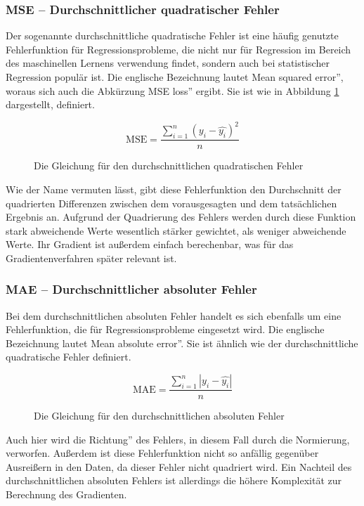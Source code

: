 \documentclass[11pt]{article}
\begin{document}
\subsubsection{MSE -- Durchschnittlicher quadratischer Fehler}
Der sogenannte durchschnittliche quadratische Fehler ist eine häufig genutzte Fehlerfunktion für Regressionsprobleme, die nicht nur für Regression im Bereich des maschinellen Lernens verwendung findet, sondern auch bei statistischer Regression populär ist. Die englische Bezeichnung lautet \glqq Mean squared error'', woraus sich auch die Abkürzung \glqq MSE loss'' ergibt. Sie ist wie in Abbildung \ref{MSE_equation} dargestellt, definiert.
\begin{figure}[h]
	\begin{equation*}
		\textrm{MSE}=\dfrac{\sum\limits_{i=1}^n(y_i-\hat{y_i})^2}{n}
	\end{equation*}
	\caption{Die Gleichung für den durchschnittlichen quadratischen Fehler}
	\label{MSE_equation}
\end{figure}
\newline
Wie der Name vermuten lässt, gibt diese Fehlerfunktion den Durchschnitt der quadrierten Differenzen zwischen dem vorausgesagten und dem tatsächlichen Ergebnis an. Aufgrund der Quadrierung des Fehlers werden durch diese Funktion stark abweichende Werte wesentlich stärker gewichtet, als weniger abweichende Werte. Ihr Gradient ist außerdem einfach berechenbar, was für das Gradientenverfahren später relevant ist.\cite{3}
\subsubsection{MAE -- Durchschnittlicher absoluter Fehler}
Bei dem durchschnittlichen absoluten Fehler handelt es sich ebenfalls um eine Fehlerfunktion, die für Regressionsprobleme eingesetzt wird. Die englische Bezeichnung lautet \glqq Mean absolute error''. Sie ist ähnlich wie der durchschnittliche quadratische Fehler definiert.
\begin{figure}[h]
	\begin{equation*}
	\textrm{MAE}=\dfrac{\sum\limits_{i=1}^n|y_i-\hat{y_i}|}{n}
	\end{equation*}
	\caption{Die Gleichung für den durchschnittlichen absoluten Fehler}
	\label{MAE_equation}
\end{figure}
\newline
Auch hier wird die \glqq Richtung'' des Fehlers, in diesem Fall durch die Normierung, verworfen. Außerdem ist diese Fehlerfunktion nicht so anfällig gegenüber Ausreißern in den Daten, da dieser Fehler nicht quadriert wird. Ein Nachteil des durchschnittlichen absoluten Fehlers ist allerdings die höhere Komplexität zur Berechnung des Gradienten.\cite{3}
\end{document}
